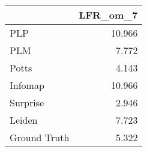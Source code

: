 \begin{tabular}{lr}
\toprule
{} & LFR_om_7 \\
\midrule
PLP          &   10.966 \\
PLM          &    7.772 \\
Potts        &    4.143 \\
Infomap      &   10.966 \\
Surprise     &    2.946 \\
Leiden       &    7.723 \\
Ground Truth &    5.322 \\
\bottomrule
\end{tabular}
